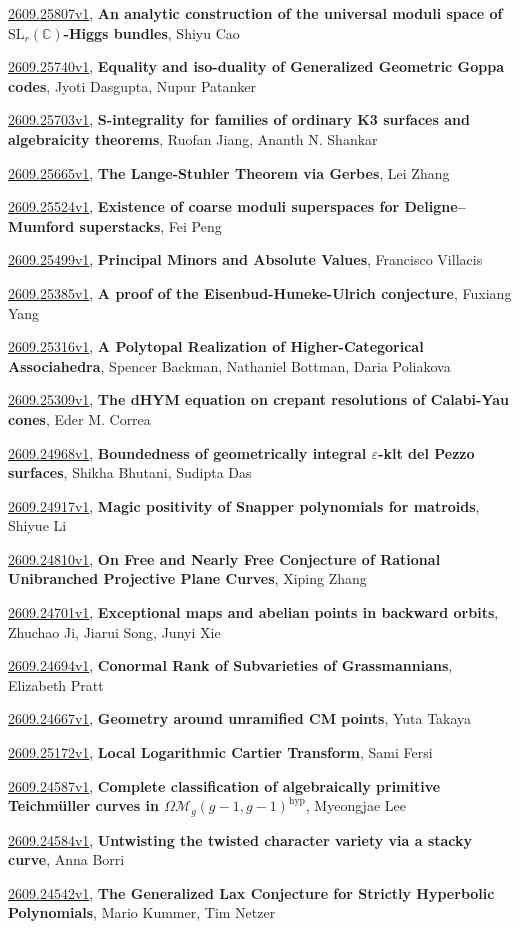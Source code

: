 \documentclass[9pt, a4paper]{article}
\theoremstyle{plain}
\theoremstyle{definition}
\theoremstyle{remark}
\newcommand{\arxiv}[3]{\href{https://arxiv.org/abs/#1}{#1}, \textbf{\textcolor{arxivblue}{#2}}, #3}
\begin{document}
\arxiv{2609.25807v1}{An analytic construction of the universal moduli space of $\mathrm{SL}_r(\mathbb C)$-Higgs bundles}{Shiyu Cao}

\arxiv{2609.25740v1}{Equality and iso-duality of Generalized Geometric Goppa codes}{Jyoti Dasgupta, Nupur Patanker}

\arxiv{2609.25703v1}{S-integrality for families of ordinary K3 surfaces and algebraicity theorems}{Ruofan Jiang, Ananth N. Shankar}

\arxiv{2609.25665v1}{The Lange-Stuhler Theorem via Gerbes}{Lei Zhang}

\arxiv{2609.25524v1}{Existence of coarse moduli superspaces for Deligne--Mumford superstacks}{Fei Peng}

\arxiv{2609.25499v1}{Principal Minors and Absolute Values}{Francisco Villacis}

\arxiv{2609.25385v1}{A proof of the Eisenbud-Huneke-Ulrich conjecture}{Fuxiang Yang}

\arxiv{2609.25316v1}{A Polytopal Realization of Higher-Categorical Associahedra}{Spencer Backman, Nathaniel Bottman, Daria Poliakova}

\arxiv{2609.25309v1}{The dHYM equation on crepant resolutions of Calabi-Yau cones}{Eder M. Correa}

\arxiv{2609.24968v1}{Boundedness of geometrically integral $ε$-klt del Pezzo surfaces}{Shikha Bhutani, Sudipta Das}

\arxiv{2609.24917v1}{Magic positivity of Snapper polynomials for matroids}{Shiyue Li}

\arxiv{2609.24810v1}{On Free and Nearly Free Conjecture of Rational Unibranched Projective Plane Curves}{Xiping Zhang}

\arxiv{2609.24701v1}{Exceptional maps and abelian points in backward orbits}{Zhuchao Ji, Jiarui Song, Junyi Xie}

\arxiv{2609.24694v1}{Conormal Rank of Subvarieties of Grassmannians}{Elizabeth Pratt}

\arxiv{2609.24667v1}{Geometry around unramified CM points}{Yuta Takaya}

\arxiv{2609.25172v1}{Local Logarithmic Cartier Transform}{Sami Fersi}

\arxiv{2609.24587v1}{Complete classification of algebraically primitive Teichmüller curves in $Ω\mathcal{M}_g(g-1,g-1)^{\mathrm{hyp}}$}{Myeongjae Lee}

\arxiv{2609.24584v1}{Untwisting the twisted character variety via a stacky curve}{Anna Borri}

\arxiv{2609.24542v1}{The Generalized Lax Conjecture for Strictly Hyperbolic Polynomials}{Mario Kummer, Tim Netzer}
\end{document}
